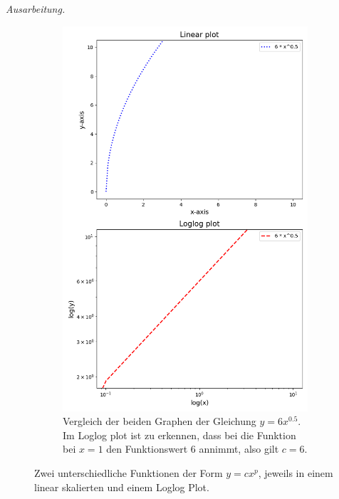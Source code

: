 \documentclass[]{article}
\newenvironment{ausarbeitung}{\vspace{3mm}\noindent\textit{Ausarbeitung.}}{}
\begin{document}
\begin{ausarbeitung}
\begin{figure}
\begin{subfigure}{0.48\textwidth}
			\includegraphics[width=\textwidth]{loglog_plot_b}
			\caption{Vergleich der beiden Graphen der Gleichung $y = 6x^{0.5}$. Im Loglog plot ist zu erkennen, dass bei die Funktion bei $x=1$ den Funktionswert $6$ annimmt, also gilt $c = 6$.}
			\label{fig:loglog_plot_b}
		\end{subfigure}
		
		\caption{Zwei unterschiedliche Funktionen der Form $y = cx^p$, jeweils in einem linear skalierten und einem Loglog Plot.}
		\label{fig:loglog_plot}
	\end{figure}
	
\end{ausarbeitung}
\newpage
\end{document}
